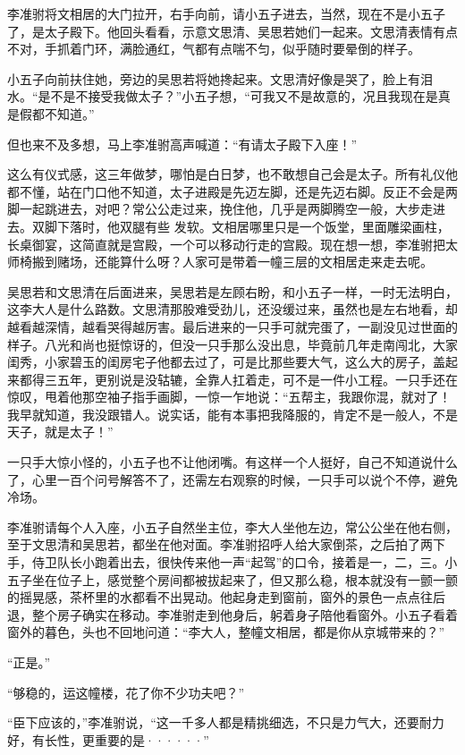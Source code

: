 李准驸将文相居的大门拉开，右手向前，请小五子进去，当然，现在不是小五子了，是太子殿下。他回头看看，示意文思清、吴思若她们一起来。文思清表情有点不对，手抓着门环，满脸通红，气都有点喘不匀，似乎随时要晕倒的样子。

小五子向前扶住她，旁边的吴思若将她搀起来。文思清好像是哭了，脸上有泪水。“是不是不接受我做太子？”小五子想，“可我又不是故意的，况且我现在是真是假都不知道。”

但也来不及多想，马上李准驸高声喊道：“有请太子殿下入座！”

这么有仪式感，这三年做梦，哪怕是白日梦，也不敢想自己会是太子。所有礼仪他都不懂，站在门口他不知道，太子进殿是先迈左脚，还是先迈右脚。反正不会是两脚一起跳进去，对吧？常公公走过来，挽住他，几乎是两脚腾空一般，大步走进去。双脚下落时，他双腿有些
发软。文相居哪里只是一个饭堂，里面雕梁画柱，长桌御宴，这简直就是宫殿，一个可以移动行走的宫殿。现在想一想，李准驸把太师椅搬到赌场，还能算什么呀？人家可是带着一幢三层的文相居走来走去呢。

吴思若和文思清在后面进来，吴思若是左顾右盼，和小五子一样，一时无法明白，这李大人是什么路数。文思清那股难受劲儿，还没缓过来，虽然也是左右地看，却越看越深情，越看哭得越厉害。最后进来的一只手可就完蛋了，一副没见过世面的样子。八光和尚也挺惊讶的，但没一只手那么没出息，毕竟前几年走南闯北，大家闺秀，小家碧玉的闺房宅子他都去过了，可是比那些要大气，这么大的房子，盖起来都得三五年，更别说是没轱辘，全靠人扛着走，可不是一件小工程。一只手还在惊叹，甩着他那空袖子指手画脚，一惊一乍地说：“五帮主，我跟你混，就对了！我早就知道，我没跟错人。说实话，能有本事把我降服的，肯定不是一般人，不是天子，就是太子！”

一只手大惊小怪的，小五子也不让他闭嘴。有这样一个人挺好，自己不知道说什么了，心里一百个问号解答不了，还需左右观察的时候，一只手可以说个不停，避免冷场。

李准驸请每个人入座，小五子自然坐主位，李大人坐他左边，常公公坐在他右侧，至于文思清和吴思若，都坐在他对面。李准驸招呼人给大家倒茶，之后拍了两下手，侍卫队长小跑着出去，很快传来他一声“起驾”的口令，接着是一，二，三。小五子坐在位子上，感觉整个房间都被拔起来了，但又那么稳，根本就没有一颤一颤的摇晃感，茶杯里的水都看不出晃动。他起身走到窗前，窗外的景色一点点往后退，整个房子确实在移动。李准驸走到他身后，躬着身子陪他看窗外。小五子看着窗外的暮色，头也不回地问道：“李大人，整幢文相居，都是你从京城带来的？”

“正是。”

“够稳的，运这幢楼，花了你不少功夫吧？”

“臣下应该的，”李准驸说，“这一千多人都是精挑细选，不只是力气大，还要耐力好，有长性，更重要的是······”

